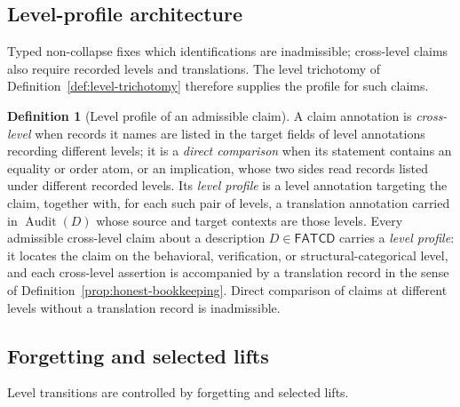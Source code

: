 \documentclass[11pt]{article}
\theoremstyle{definition}
\newtheorem{definition}[theorem]{Definition}
\newcommand{\FATCD}{\ensuremath{\mathsf{FATCD}}}
\newcommand{\Audit}[1]{\ensuremath{\operatorname{Audit}\!\left(#1\right)}}
\begin{document}
\subsection{Level-profile architecture}\label{subsec:level-profile-architecture}

Typed non-collapse fixes which identifications are inadmissible; cross-level
claims also require recorded levels and translations. The level trichotomy of
Definition~\ref{def:level-trichotomy} therefore supplies the profile for such
claims.

\begin{definition}[Level profile of an admissible claim]\label{prop:level-profile}
A claim annotation is \emph{cross-level} when records it names are listed in the target fields of level annotations recording different levels; it is a \emph{direct comparison} when
its statement contains an equality or order atom, or an implication, whose two sides read records listed under different recorded levels.
Its \emph{level profile} is a level annotation targeting the claim, together
with, for each such pair of levels, a translation annotation carried in
\(\Audit{D}\) whose source and target contexts are those levels.
Every admissible cross-level claim about a description \(D \in \FATCD{}\) carries a
\emph{level profile}: it locates the claim on the behavioral,
verification, or structural-categorical level, and each cross-level
assertion is accompanied by a translation record in the sense of
Definition~\ref{prop:honest-bookkeeping}. Direct comparison of claims at
different levels without a translation record is inadmissible.
\end{definition}

\subsection{Forgetting and selected lifts}\label{subsec:forgetting-lifts}

Level transitions are controlled by forgetting and selected lifts.
\end{document}
